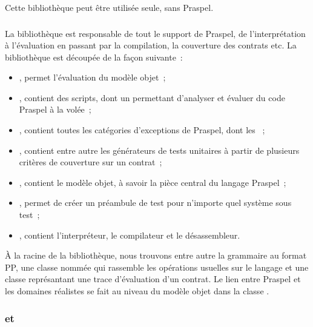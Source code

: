 Cette bibliothèque peut être utilisée seule, sans Praspel.

\subsubsection{}

La bibliothèque  est responsable de tout le support de
Praspel, de l'interprétation à l'évaluation en passant par la compilation, la
couverture des contrats etc. La bibliothèque est découpée de la façon suivante~:
%
\begin{itemize}

\item {}, permet l'évaluation du modèle objet~;

\item {}, contient des scripts, dont un  permettant
d'analyser et évaluer du code Praspel à la volée~;

\item {}, contient toutes les catégories d'exceptions de Praspel,
dont les ~;

\item {}, contient entre autre les générateurs de tests unitaires à
partir de plusieurs critères de couverture sur un contrat~;

\item {}, contient le modèle objet, à savoir la pièce central du
langage Praspel~;

\item {}, permet de créer un préambule de test pour n'importe quel
système sous test~;

\item {}, contient l'interpréteur, le compilateur et le
désassembleur.

\end{itemize}

À la racine de la bibliothèque, nous trouvons entre autre la grammaire au format
PP, une classe nommée  qui rassemble les opérations
usuelles sur le langage et une classe représantant une trace d'évaluation d'un
contrat. Le lien entre Praspel et les domaines réalistes se fait au niveau du
modèle objet dans la classe
.

\subsubsection{ et }

